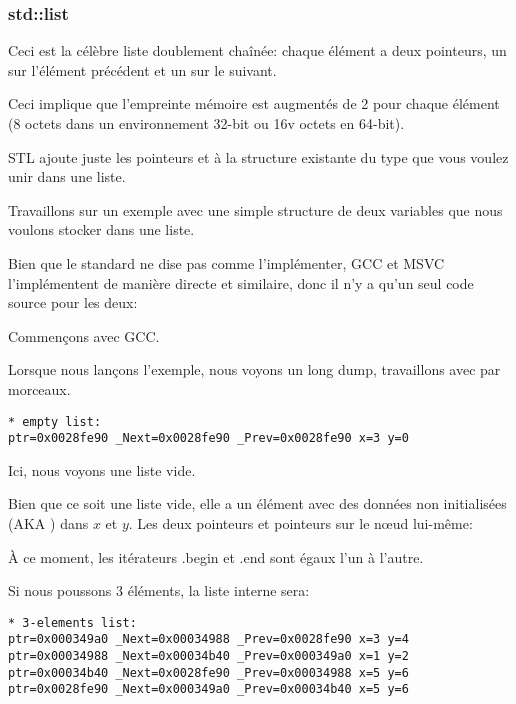 \subsubsection{std::list}
\label{std_list}

Ceci est la célèbre liste doublement chaînée: chaque élément a deux pointeurs, un
sur l'élément précédent et un sur le suivant.

Ceci implique que l'empreinte mémoire est augmentés de 2  pour
chaque élément (8 octets dans un environnement 32-bit ou 16v octets en 64-bit).

\Cpp STL ajoute juste les pointeurs  et  à la structure existante
du type que vous voulez unir dans une liste.

Travaillons sur un exemple avec une simple structure de deux variables que nous voulons
stocker dans une liste.

Bien que le standard \Cpp ne dise pas comme l'implémenter, GCC et MSVC l'implémentent
de manière directe et similaire, donc il n'y a qu'un seul code source pour les deux:




Commençons avec GCC.

Lorsque nous lançons l'exemple, nous voyons un long dump, travaillons avec par morceaux.

\begin{lstlisting}
* empty list:
ptr=0x0028fe90 _Next=0x0028fe90 _Prev=0x0028fe90 x=3 y=0
\end{lstlisting}

Ici, nous voyons une liste vide.

Bien que ce soit une liste vide, elle a un élément avec des données non initialisées
(\ac{AKA} ) dans $x$ et $y$.
Les deux pointeurs  et  pointeurs sur le n\oe{}ud lui-même:



À ce moment, les itérateurs .begin et .end sont égaux l'un à l'autre.

Si nous poussons 3 éléments, la liste interne sera:

\begin{lstlisting}
* 3-elements list:
ptr=0x000349a0 _Next=0x00034988 _Prev=0x0028fe90 x=3 y=4
ptr=0x00034988 _Next=0x00034b40 _Prev=0x000349a0 x=1 y=2
ptr=0x00034b40 _Next=0x0028fe90 _Prev=0x00034988 x=5 y=6
ptr=0x0028fe90 _Next=0x000349a0 _Prev=0x00034b40 x=5 y=6
\end{lstlisting}

